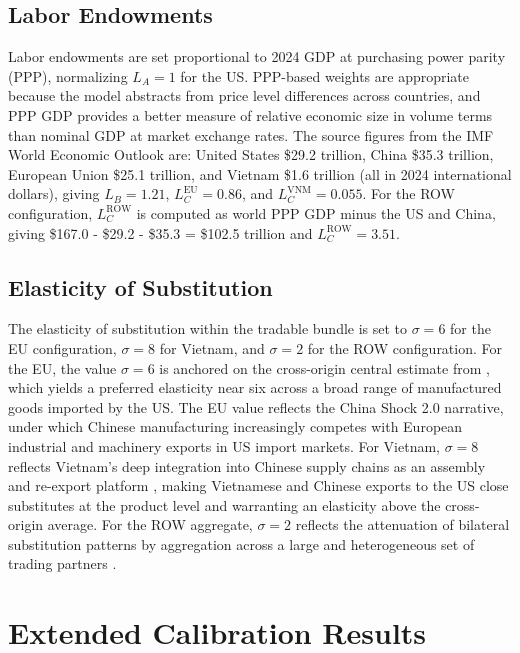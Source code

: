 \documentclass[11pt]{article}
\theoremstyle{plain}
\theoremstyle{remark}
\numberwithin{lemma}{section}
\numberwithin{proposition}{section}
\numberwithin{corollary}{section}
\begin{document}
\begin{appendix}
\subsection*{Labor Endowments}
Labor endowments are set proportional to 2024 GDP at purchasing power parity (PPP), normalizing $L_A = 1$ for the US. PPP-based weights are appropriate because the model abstracts from price level differences across countries, and PPP GDP provides a better measure of relative economic size in volume terms than nominal GDP at market exchange rates. The source figures from the IMF World Economic Outlook \citep{imf2024weo} are: United States \$29.2 trillion, China \$35.3 trillion, European Union \$25.1 trillion, and Vietnam \$1.6 trillion (all in 2024 international dollars), giving $L_B = 1.21$, $L_C^{\mathrm{EU}} = 0.86$, and $L_C^{\mathrm{VNM}} = 0.055$. For the ROW configuration, $L_C^{\mathrm{ROW}}$ is computed as world PPP GDP minus the US and China, giving \$167.0 - \$29.2 - \$35.3 = \$102.5 trillion and $L_C^{\mathrm{ROW}} = 3.51$.

\subsection*{Elasticity of Substitution}
The elasticity of substitution within the tradable bundle is set to $\sigma = 6$ for the EU configuration, $\sigma = 8$ for Vietnam, and $\sigma = 2$ for the ROW configuration. For the EU, the value $\sigma = 6$ is anchored on the cross-origin central estimate from \citet{amiti2019impact}, which yields a preferred elasticity near six across a broad range of manufactured goods imported by the US. The EU value reflects the China Shock 2.0 narrative, under which Chinese manufacturing increasingly competes with European industrial and machinery exports in US import markets. For Vietnam, $\sigma = 8$ reflects Vietnam's deep integration into Chinese supply chains as an assembly and re-export platform \citep{fajgelbaum2024trade}, making Vietnamese and Chinese exports to the US close substitutes at the product level and warranting an elasticity above the cross-origin average. For the ROW aggregate, $\sigma = 2$ reflects the attenuation of bilateral substitution patterns by aggregation across a large and heterogeneous set of trading partners \citep{fajgelbaum2020return, feenstra2018}.

\section{Extended Calibration Results}
\label{app:extended_calibrations}


\end{appendix}
\end{document}
